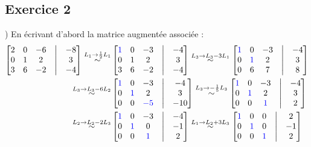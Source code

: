 \documentclass{article}
\begin{document}
\subsection*{Exercice 2}
) En écrivant d'abord la matrice augmentée associée : \begin{align*}
    \begin{bmatrix}
    2 & 0 & -6 & \bigm| & -8 \\
    0 & 1 & 2 & \bigm| & 3 \\
    3 & 6 & -2 & \bigm| & -4
    \end{bmatrix}
    \overset{L_1 \rightarrow \frac{1}{2}L_1}{\sim}
    &\begin{bmatrix}
    \color{blue}1 & 0 & -3 & \bigm| & -4 \\
    0 & 1 & 2 & \bigm| & 3 \\
    3 & 6 & -2 & \bigm| & -4
    \end{bmatrix}
    \overset{L_3 \rightarrow L_3 -3L_1}{\sim}
    \begin{bmatrix}
    \color{blue}1 & 0 & -3 & \bigm| & -4 \\
    0 & \color{blue}1 & 2 & \bigm| & 3 \\
    0 & 6 & 7 & \bigm| & 8
    \end{bmatrix} \\
    \overset{L_3 \rightarrow L_3 -6L_2}{\sim}
    &\begin{bmatrix}
    \color{blue}1 & 0 & -3 & \bigm| & -4 \\
    0 & \color{blue}1 & 2 & \bigm| & 3 \\
    0 & 0 & \color{blue}-5 & \bigm| & -10
    \end{bmatrix}
    \overset{L_3 \rightarrow -\frac{1}{5}L_3}{\sim}
    \begin{bmatrix}
    \color{blue}1 & 0 & -3 & \bigm| & -4 \\
    0 & \color{blue}1 & 2 & \bigm| & 3 \\
    0 & 0 & \color{blue}1 & \bigm| & 2
    \end{bmatrix} \\
    \overset{L_2 \rightarrow L_2 -2L_3}{\sim}
    &\begin{bmatrix}
    \color{blue}1 & 0 & -3 & \bigm| & -4 \\
    0 & \color{blue}1 & 0 & \bigm| & -1 \\
    0 & 0 & \color{blue}1 & \bigm| & 2
    \end{bmatrix}
    \overset{L_1 \rightarrow L_2 +3L_3}{\sim}
    \begin{bmatrix}
    \color{blue}1 & 0 & 0 & \bigm| & 2 \\
    0 & \color{blue}1 & 0 & \bigm| & -1 \\
    0 & 0 & \color{blue}1 & \bigm| & 2
    \end{bmatrix}
\end{align*} 
\end{document}
